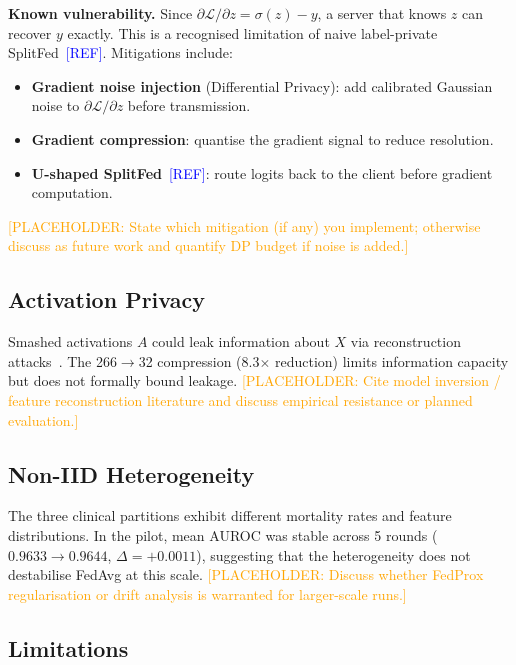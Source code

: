 \documentclass[10pt,twocolumn]{article}
\newcommand{\placeholder}[1]{\textcolor{orange}{[PLACEHOLDER: #1]}}
\newcommand{\refneeded}{\textcolor{blue}{[REF]}}
\begin{document}
\textbf{Known vulnerability.}  Since
$\partial\mathcal{L}/\partial z = \sigma(z) - y$, a server that
knows $z$ can recover $y$ exactly.  This is a recognised limitation
of naive label-private SplitFed~\refneeded.  Mitigations include:
\begin{itemize}[leftmargin=*]
  \item \textbf{Gradient noise injection} (Differential Privacy): add
        calibrated Gaussian noise to $\partial\mathcal{L}/\partial z$
        before transmission.
  \item \textbf{Gradient compression}: quantise the gradient signal to
        reduce resolution.
  \item \textbf{U-shaped SplitFed}~\refneeded: route logits back to
        the client before gradient computation.
\end{itemize}
\placeholder{State which mitigation (if any) you implement; otherwise
discuss as future work and quantify DP budget if noise is added.}

\subsection{Activation Privacy}

Smashed activations $A$ could leak information about $X$ via
reconstruction attacks~\cite{he2019}. The 266$\to$32 compression
(8.3$\times$ reduction) limits information capacity but does not
formally bound leakage.
\placeholder{Cite model inversion / feature reconstruction literature
and discuss empirical resistance or planned evaluation.}

\subsection{Non-IID Heterogeneity}

The three clinical partitions exhibit different mortality rates and
feature distributions.  In the pilot, mean AUROC was stable across
5 rounds ($0.9633\to0.9644$, $\Delta=+0.0011$), suggesting that the
heterogeneity does not destabilise FedAvg at this scale.
\placeholder{Discuss whether FedProx regularisation or drift analysis
is warranted for larger-scale runs.}

\subsection{Limitations}
\end{document}
